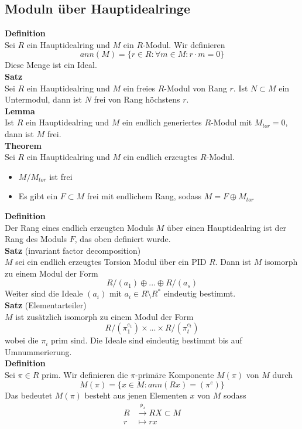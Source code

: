 \documentclass[a4paper, 12pt]{article}
\begin{document}
\subsection{Moduln über Hauptidealringe}
\textbf{Definition}\\
Sei $R$ ein Hauptidealring und $M$ ein $R$-Modul. Wir definieren \[ann(M) = \{r \in R: \forall m \in M: r\cdot m = 0\}\]
Diese Menge ist ein Ideal.\\
\textbf{Satz}\\
Sei $R$ ein Hauptidealring und $M$ ein freies $R$-Modul von Rang $r$. Ist $N\subset M$ ein Untermodul, dann ist $N$ frei von Rang höchstens $r$.\\
\textbf{Lemma}\\
Ist $R$ ein Hauptidealring und $M$ ein endlich generiertes $R$-Modul mit $M_{tor} = 0$, dann ist $M$ frei.\\
\textbf{Theorem}\\
Sei $R$ ein Hauptidealring und $M$ ein endlich erzeugtes $R$-Modul. \begin{itemize}
	\item $M/M_{tor}$ ist frei
	\item Es gibt ein $F \subset M$ frei mit endlichem Rang, sodass $M = F\oplus M_{tor}$
\end{itemize}
\textbf{Definition}\\
Der Rang eines endlich erzeugten Moduls $M$ über einen Hauptidealring ist der Rang des Moduls $F$, das oben definiert wurde.\\
\textbf{Satz} (invariant factor decomposition)\\
$M$ sei ein endlich erzeugtes Torsion Modul über ein PID $R$. Dann ist $M$ isomorph zu einem Modul der Form \[R/(a_1) \oplus ... \oplus R/(a_s)\] Weiter sind die Ideale $(a_i)$ mit $a_i \in R\setminus R^*$ eindeutig bestimmt.\\
\textbf{Satz} (Elementarteiler)\\
$M$ ist zusätzlich isomorph zu einem Modul der Form \[R/(\pi_1^{e_1}) \times ... \times R/(\pi_t^{e_t})\] wobei die $\pi_i$ prim sind. Die Ideale sind eindeutig bestimmt bis auf Umnummerierung.\\
\textbf{Definition}\\
Sei $\pi \in R$ prim. Wir definieren die $\pi$-primäre Komponente $M(\pi)$ von $M$ durch \[M(\pi) = \{x \in M: ann(Rx) = (\pi^e)\}\]
Das bedeutet $M(\pi)$ besteht aus jenen Elementen $x$ von $M$ sodass \begin{align*}
	R & \overset{\phi_x}{\to} RX \subset M\\
	r & \mapsto rx
\end{align*}
\end{document}
